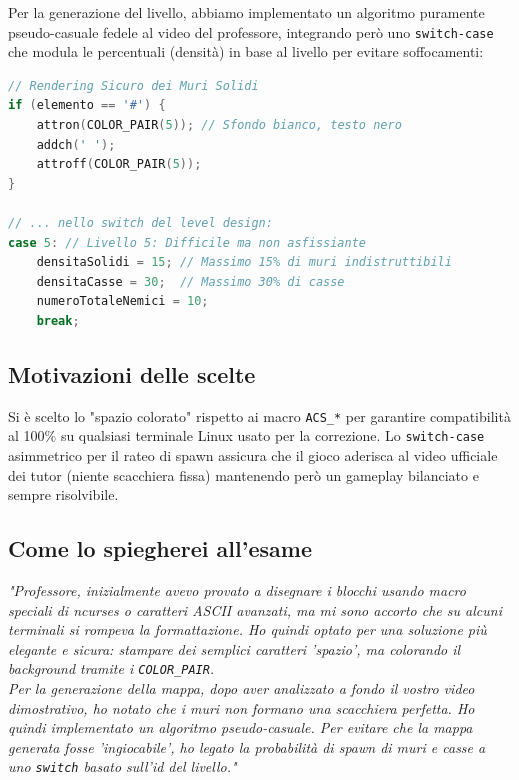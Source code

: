 \documentclass[12pt,a4paper]{article}
\begin{document}
Per la generazione del livello, abbiamo implementato un algoritmo puramente pseudo-casuale fedele al video del professore, integrando però uno \texttt{switch-case} che modula le percentuali (densità) in base al livello per evitare soffocamenti:

\begin{lstlisting}[language=C++]
// Rendering Sicuro dei Muri Solidi
if (elemento == '#') {
    attron(COLOR_PAIR(5)); // Sfondo bianco, testo nero
    addch(' ');
    attroff(COLOR_PAIR(5));
}

// ... nello switch del level design:
case 5: // Livello 5: Difficile ma non asfissiante
    densitaSolidi = 15; // Massimo 15% di muri indistruttibili
    densitaCasse = 30;  // Massimo 30% di casse
    numeroTotaleNemici = 10;
    break;
\end{lstlisting}

\subsection{Motivazioni delle scelte}
Si è scelto lo "spazio colorato" rispetto ai macro \texttt{ACS\_*} per garantire compatibilità al 100\% su qualsiasi terminale Linux usato per la correzione. Lo \texttt{switch-case} asimmetrico per il rateo di spawn assicura che il gioco aderisca al video ufficiale dei tutor (niente scacchiera fissa) mantenendo però un gameplay bilanciato e sempre risolvibile.

\subsection{Come lo spiegherei all'esame}
\textit{"Professore, inizialmente avevo provato a disegnare i blocchi usando macro speciali di ncurses o caratteri ASCII avanzati, ma mi sono accorto che su alcuni terminali si rompeva la formattazione. Ho quindi optato per una soluzione più elegante e sicura: stampare dei semplici caratteri 'spazio', ma colorando il background tramite i \texttt{COLOR\_PAIR}. \\
Per la generazione della mappa, dopo aver analizzato a fondo il vostro video dimostrativo, ho notato che i muri non formano una scacchiera perfetta. Ho quindi implementato un algoritmo pseudo-casuale. Per evitare che la mappa generata fosse 'ingiocabile', ho legato la probabilità di spawn di muri e casse a uno \texttt{switch} basato sull'id del livello."}

\vspace{1cm}
\end{document}
